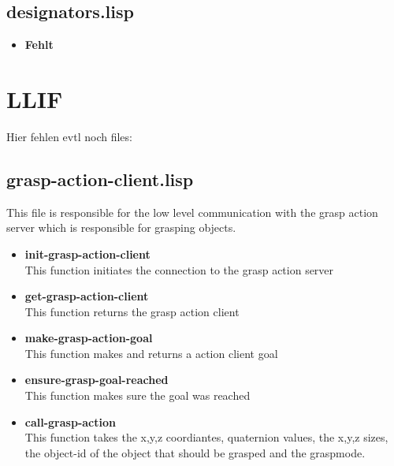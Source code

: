 \documentclass[main.tex]{subfiles}
\begin{document}
	    \subsection{designators.lisp}
	    \begin{itemize}
	    	\item \textbf{Fehlt} \\
	    \end{itemize}

	  	\section{LLIF}
		Hier fehlen evtl noch files:
		\subsection{grasp-action-client.lisp}
		This file is responsible for the low level communication with the
		grasp action server which is responsible for grasping objects.
		\begin{itemize}
			\item \textbf{init-grasp-action-client} \\
			This function initiates the connection to the grasp action server
			\item \textbf{get-grasp-action-client} \\
			This function returns the grasp action client
			\item \textbf{make-grasp-action-goal} \\
			This function makes and returns a action client goal
			\item \textbf{ensure-grasp-goal-reached} \\
            This function makes sure the goal was reached
			\item \textbf{call-grasp-action} \\
			This function takes the x,y,z coordiantes, quaternion values, the x,y,z sizes, the object-id of the object that should be grasped and the graspmode.
		\end{itemize}
\end{document}
